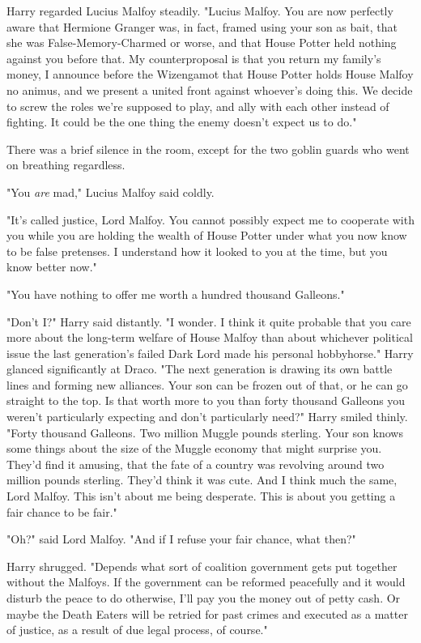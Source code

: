 Harry regarded Lucius Malfoy steadily. "Lucius Malfoy. You are now perfectly
aware that Hermione Granger was, in fact, framed using your son as bait, that
she was False-Memory-Charmed or worse, and that House Potter held nothing
against you before that. My counterproposal is that you return my family's
money, I announce before the Wizengamot that House Potter holds House Malfoy no
animus, and we present a united front against whoever's doing this. We decide
to screw the roles we're supposed to play, and ally with each other instead of
fighting. It could be the one thing the enemy doesn't expect us to do."

There was a brief silence in the room, except for the two goblin guards who
went on breathing regardless.

"You \emph{are} mad," Lucius Malfoy said coldly.

"It's called justice, Lord Malfoy. You cannot possibly expect me to cooperate
with you while you are holding the wealth of House Potter under what you now
know to be false pretenses. I understand how it looked to you at the time, but
you know better now."

"You have nothing to offer me worth a hundred thousand Galleons."

"Don't I?" Harry said distantly. "I wonder. I think it quite probable that you
care more about the long-term welfare of House Malfoy than about whichever
political issue the last generation's failed Dark Lord made his personal
hobbyhorse." Harry glanced significantly at Draco. "The next generation is
drawing its own battle lines and forming new alliances. Your son can be frozen
out of that, or he can go straight to the top. Is that worth more to you than
forty thousand Galleons you weren't particularly expecting and don't
particularly need?" Harry smiled thinly. "Forty thousand Galleons. Two million
Muggle pounds sterling. Your son knows some things about the size of the Muggle
economy that might surprise you. They'd find it amusing, that the fate of a
country was revolving around two million pounds sterling. They'd think it was
cute. And I think much the same, Lord Malfoy. This isn't about me being
desperate. This is about you getting a fair chance to be fair."

"Oh?" said Lord Malfoy. "And if I refuse your fair chance, what then?"

Harry shrugged. "Depends what sort of coalition government gets put together
without the Malfoys. If the government can be reformed peacefully and it would
disturb the peace to do otherwise, I'll pay you the money out of petty cash. Or
maybe the Death Eaters will be retried for past crimes and executed as a matter
of justice, as a result of due legal process, of course."

